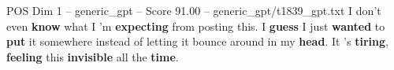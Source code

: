 \begin{textsample}{POS Dim 1 – generic\_gpt – Score 91.00 – generic\_gpt/t1839\_gpt.txt}
I don't even \textbf{know} what I ’m \textbf{expecting} from posting this.
I \textbf{guess} I just \textbf{wanted} to \textbf{put} it somewhere instead of letting it bounce around in my \textbf{head}.
It ’s \textbf{tiring}, \textbf{feeling} this \textbf{invisible} all the \textbf{time}.

\end{textsample}
